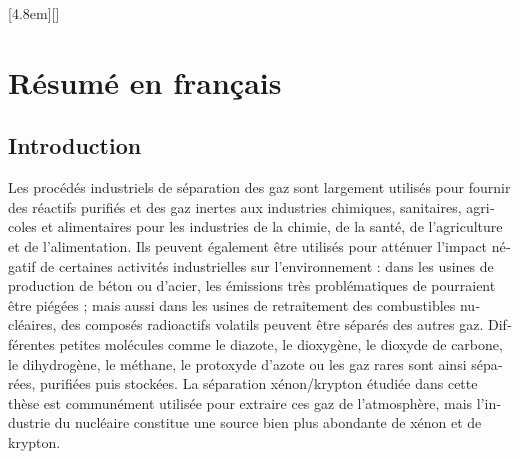 \documentclass[thesis]{subfiles}
\begin{document}
\begin{otherlanguage}{french}

\renewcommand{\thesection}{\arabic{section}}
\renewcommand{\thesubsection}{\arabic{section}.\arabic{subsection}}
\renewcommand{\thefigure}{R\arabic{figure}}
\setcounter{figure}{0}
[4.8em]{\addvspace{0.1em}}{\contentslabel{2.2em}}{}{\contentspage}[]

\chapter*{Résumé en français}
\startcontents[chapters]
\printpartialtoc

\section*{Introduction}

Les procédés industriels de séparation des gaz sont largement utilisés pour fournir des réactifs purifiés et des gaz inertes aux industries chimiques, sanitaires, agricoles et alimentaires pour les industries de la chimie, de la santé, de l'agriculture et de l'alimentation. Ils peuvent également être utilisés pour atténuer l'impact négatif de certaines activités industrielles sur l'environnement : dans les usines de production de béton ou d'acier, les émissions très problématiques de  pourraient être piégées ; mais aussi dans les usines de retraitement des combustibles nucléaires, des composés radioactifs volatils peuvent être séparés des autres gaz. Différentes petites molécules comme le diazote, le dioxygène, le dioxyde de carbone, le dihydrogène, le méthane, le protoxyde d'azote ou les gaz rares sont ainsi séparées, purifiées puis stockées. La séparation xénon/krypton étudiée dans cette thèse est communément utilisée pour extraire ces gaz de l'atmosphère, mais l'industrie du nucléaire constitue une source bien plus abondante de xénon et de krypton.


\end{otherlanguage}
\end{document}

